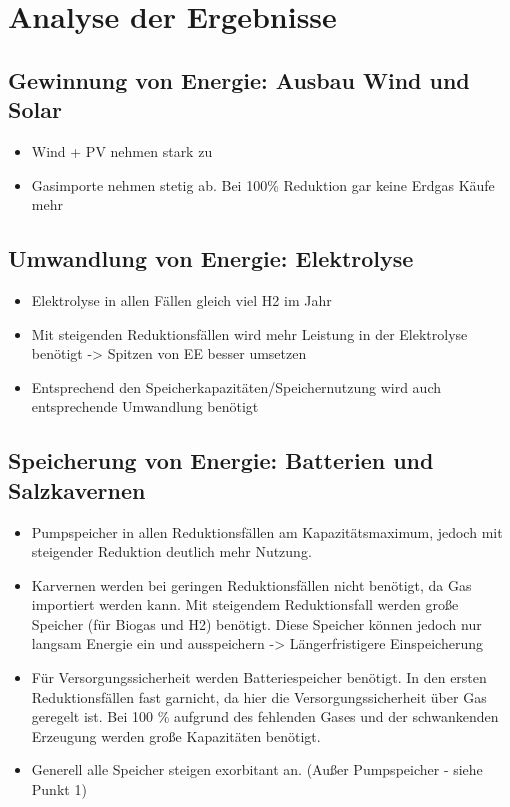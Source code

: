 \section{Analyse der Ergebnisse}

\subsection{Gewinnung von Energie: Ausbau Wind und Solar}
\begin{itemize}
  \item Wind + PV nehmen stark zu
  \item Gasimporte nehmen stetig ab. Bei 100\% Reduktion gar keine Erdgas Käufe mehr
\end{itemize}


\subsection{Umwandlung von Energie: Elektrolyse}
\begin{itemize}
  \item Elektrolyse in allen Fällen gleich viel H2 im Jahr
  \item Mit steigenden Reduktionsfällen wird mehr Leistung in der Elektrolyse benötigt -> Spitzen von EE besser umsetzen
  \item Entsprechend den Speicherkapazitäten/Speichernutzung wird auch entsprechende Umwandlung benötigt
\end{itemize}


\subsection{Speicherung von Energie: Batterien und Salzkavernen}
\begin{itemize}
  \item Pumpspeicher in allen Reduktionsfällen am Kapazitätsmaximum, jedoch mit steigender Reduktion deutlich mehr Nutzung. 
  \item Karvernen werden bei geringen Reduktionsfällen nicht benötigt, da Gas importiert werden kann. Mit steigendem Reduktionsfall werden große Speicher (für Biogas und H2) benötigt. Diese Speicher können jedoch nur langsam Energie ein und ausspeichern -> Längerfristigere Einspeicherung
  \item Für Versorgungssicherheit werden Batteriespeicher benötigt. In den ersten Reduktionsfällen fast garnicht, da hier die Versorgungssicherheit über Gas geregelt ist. Bei 100 \% aufgrund des fehlenden Gases und der schwankenden Erzeugung werden große Kapazitäten benötigt.
  \item Generell alle Speicher steigen exorbitant an. (Außer Pumpspeicher - siehe Punkt 1)
\end{itemize}



